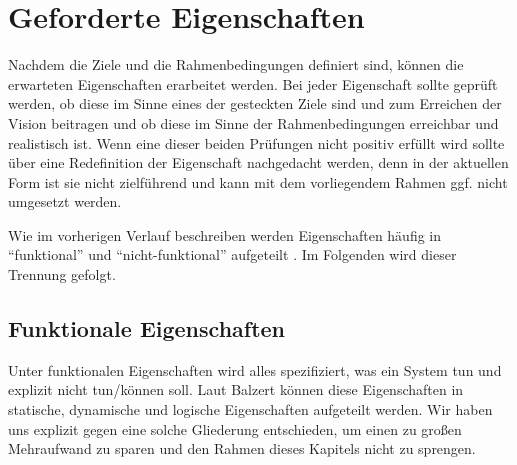 \section{Geforderte Eigenschaften}
Nachdem die Ziele und die Rahmenbedingungen definiert sind, können die erwarteten Eigenschaften erarbeitet werden. Bei jeder Eigenschaft sollte geprüft werden, ob diese im Sinne eines der gesteckten Ziele sind und zum Erreichen der Vision beitragen und ob diese im Sinne der Rahmenbedingungen erreichbar und realistisch ist. Wenn eine dieser beiden Prüfungen nicht positiv erfüllt wird sollte über eine Redefinition der Eigenschaft nachgedacht werden, denn in der aktuellen Form ist sie nicht zielführend und kann mit dem vorliegendem Rahmen ggf. nicht umgesetzt werden.

\vspace{0.25cm}

Wie im vorherigen Verlauf beschreiben werden Eigenschaften häufig in \enquote{funktional} und \enquote{nicht-funktional} aufgeteilt \cite{Balzert.2009}. Im Folgenden wird dieser Trennung gefolgt.

\subsection{Funktionale Eigenschaften}
Unter funktionalen Eigenschaften wird alles spezifiziert, was ein System tun und explizit nicht tun/können soll. Laut Balzert können diese Eigenschaften in statische, dynamische und logische Eigenschaften aufgeteilt werden\cite{Balzert.2009}. Wir haben uns explizit gegen eine solche Gliederung entschieden, um einen zu großen Mehraufwand zu sparen und den Rahmen dieses Kapitels nicht zu sprengen.

\vspace{0.25cm}

